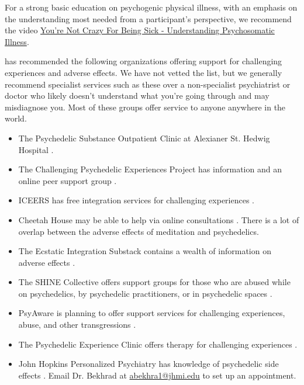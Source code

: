 \documentclass[12pt,letterpaper]{book}
\begin{document}
For a strong basic education on psychogenic physical illness, with an emphasis on the understanding most needed from a participant's perspective, we recommend the video \href{https://www.youtube.com/watch?v=oHoFqwF2OAU}{You're Not Crazy For Being Sick - Understanding Psychosomatic Illness}.

\textcite{supportNetwork} has recommended the following organizations offering support for challenging experiences and adverse effects. We have not vetted the list, but we generally recommend specialist services such as these over a non-specialist psychiatrist or doctor who likely doesn't understand what you're going through and may misdiagnose you. Most of these groups offer service to anyone anywhere in the world.
\begin{itemize}
	\item The Psychedelic Substance Outpatient Clinic at Alexianer St. Hedwig Hospital \cite{alexianerClinic}.
	\item The Challenging Psychedelic Experiences Project has information and an online peer support group \cite{peersupportgroup}.
	\item ICEERS has free integration services for challenging experiences \cite{iceers}.
	\item Cheetah House may be able to help via online consultations \cite{cheetahHouse}. There is a lot of overlap between the adverse effects of meditation and psychedelics.
	\item The Ecstatic Integration Substack contains a wealth of information on adverse effects \cite{ecstaticIntegration}.
	\item The SHINE Collective offers support groups for those who are abused while on psychedelics, by psychedelic practitioners, or in psychedelic spaces \cite{shineCollective}.
	\item PsyAware is planning to offer support services for challenging experiences, abuse, and other transgressions \cite{psyaware}.
	\item The Psychedelic Experience Clinic offers therapy for challenging experiences \cite{rabbitClinic}.
	\item John Hopkins Personalized Psychiatry has knowledge of psychedelic side effects \cite{hopkinsPersonalized}. Email Dr. Bekhrad at \href{mailto:abekhra1@jhmi.edu}{abekhra1@jhmi.edu} to set up an appointment.
\end{itemize}
\end{document}
